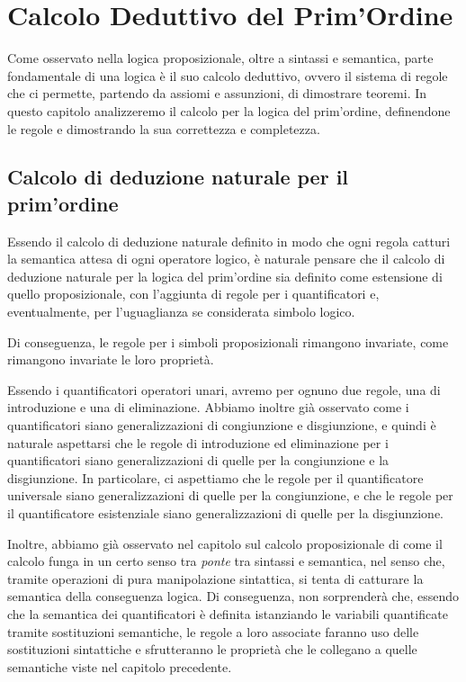 \chapter{Calcolo Deduttivo del Prim'Ordine}

Come osservato nella logica proposizionale, oltre a sintassi e semantica, parte fondamentale di una logica è il suo calcolo deduttivo, ovvero il sistema di regole che ci permette, partendo da assiomi e assunzioni, di dimostrare teoremi. In questo capitolo analizzeremo il calcolo per la logica del prim'ordine, definendone le regole e dimostrando la sua correttezza e completezza.

\section{Calcolo di deduzione naturale per il prim'ordine}

Essendo il calcolo di deduzione naturale definito in modo che ogni regola catturi la semantica attesa di ogni operatore logico, è naturale pensare che il calcolo di deduzione naturale per la logica del prim'ordine sia definito come estensione di quello proposizionale, con l'aggiunta di regole per i quantificatori e, eventualmente, per l'uguaglianza se considerata simbolo logico.

Di conseguenza, le regole per i simboli proposizionali rimangono invariate, come rimangono invariate le loro proprietà.

Essendo i quantificatori operatori unari, avremo per ognuno due regole, una di introduzione e una di eliminazione. Abbiamo inoltre già osservato come i quantificatori siano generalizzazioni di congiunzione e disgiunzione, e quindi è naturale aspettarsi che le regole di introduzione ed eliminazione per i quantificatori siano generalizzazioni di quelle per la congiunzione e la disgiunzione. In particolare, ci aspettiamo che le regole per il quantificatore universale siano generalizzazioni di quelle per la congiunzione, e che le regole per il quantificatore esistenziale siano generalizzazioni di quelle per la disgiunzione.

Inoltre, abbiamo già osservato nel capitolo sul calcolo proposizionale di come il calcolo funga in un certo senso tra \textit{ponte} tra sintassi e semantica, nel senso che, tramite operazioni di pura manipolazione sintattica, si tenta di catturare la semantica della conseguenza logica. Di conseguenza, non sorprenderà che, essendo che la semantica dei quantificatori è definita istanziando le variabili quantificate tramite sostituzioni semantiche, le regole a loro associate faranno uso delle sostituzioni sintattiche e sfrutteranno le proprietà che le collegano a quelle semantiche viste nel capitolo precedente. 

